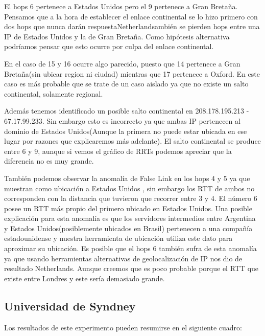 El hops 6 pertenece a Estados Unidos pero el 9 pertenece a Gran Bretaña. Pensamos que a la hora de
establecer el enlace continental se lo hizo primero con dos hops que nunca darán respuestaNetherlandsambién se
pierden hops entre una IP de Estados Unidos y la de Gran Bretaña. Como hipótesis alternativa
podríamos pensar que esto ocurre por culpa del enlace continental.%

En el caso de 15 y 16 ocurre algo parecido, puesto que 14 pertenece a Gran Bretaña(sin ubicar region
ni ciudad) mientras que 17 pertenece a Oxford. En este caso es más probable que se trate de un caso aislado
ya que no existe un salto continental, solamente regional.

Además tenemos identificado un posible salto continental en 208.178.195.213 - 67.17.99.233. Sin embargo esto
es incorrecto ya que ambas IP pertenecen al dominio de Estados Unidos(Aunque la primera no puede estar ubicada
en ese lugar por razones que explicaremos más adelante). El salto continental se produce entre 6 y 9, aunque
si vemos el gráfico de RRTs podemos apreciar que la diferencia no es muy grande.

También podemos observar la anomalía de False Link en los hops 4 y 5 ya que muestran como ubicación a Estados Unidos
, sin embargo los RTT de ambos no corresponden con la distancia que tuvieron que recorrer entre 3 y 4. El número 6
posee un RTT más propio del primero ubicado en Estados Unidos. Una posible explicación para esta anomalía es que
los servidores intermedios entre Argentina y Estados Unidos(posiblemente ubicados en Brasil) pertenecen a una
compañía estadounidense y nuestra herramienta de ubicación utiliza este dato para aproximar su ubicación. Es posible
que el hops 6 también sufra de esta anomalía ya que usando herramientas alternativas de geolocalización de IP nos dio
de resultado Netherlands. Aunque creemos que es poco probable porque el RTT que existe entre Londres y este sería demasiado
grande.

\newpage

\subsection{Universidad de Syndney}

Los resultados de este experimento pueden resumirse en el siguiente cuadro:

